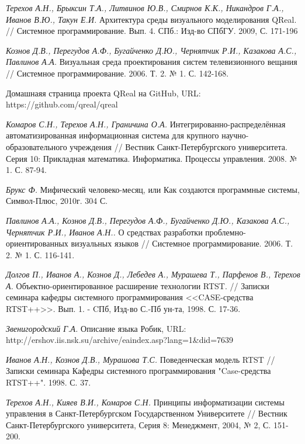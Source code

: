 \documentclass[a4paper]{article}
\begin{document}
\begin{thebibliography}{9001}

   \emph{Терехов А.Н., Брыксин Т.А., Литвинов Ю.В., Смирнов К.К., Никандров Г.А., Иванов В.Ю., Такун Е.И.} Архитектура среды визуального моделирования QReal. // Системное программирование. Вып. 4. СПб.: Изд-во СПбГУ. 2009, С. 171-196

   \emph{Кознов Д.В., Перегудов А.Ф., Бугайченко Д.Ю., Чернятчик Р.И., Казакова А.С., Павлинов А.А.} Визуальная среда проектирования систем телевизионного вещания // Системное программирование. 2006. Т. 2. № 1. С. 142-168.

   Домашнаяя страница проекта QReal на GitHub, URL: https://github.com/qreal/qreal 

   \emph{Комаров С.Н., Терехов А.Н., Граничина О.А.} Интегрированно-распределённая автоматизированная информационная система для крупного научно-образовательного учреждения // Вестник Санкт-Петербургского университета. Серия 10: Прикладная математика. Информатика. Процессы управления. 2008. № 1. С. 87-94. 

   \emph{Брукс Ф.} Мифический человеко-месяц, или Как создаются программные системы, Символ-Плюс, 2010г. 304 С.

   \emph{Павлинов А.А., Кознов Д.В., Перегудов А.Ф., Бугайченко Д.Ю., Казакова А.С., Чернятчик Р.И., Иванов А.Н..} О средствах разработки проблемно-ориентированных визуальных языков // Системное программирование. 2006. Т. 2. № 1. С. 116-141.

   \emph{Долгов П., Иванов А., Кознов Д., Лебедев А., Мурашева Т., Парфенов В., Терехов А.} Объектно-ориентированное расширение технологии RTST. // Записки семинара кафедры системного программирования <<CASE-средства RTST++>>. Вып. 1. - CПб, Изд-во С.-Пб ун-та, 1998. С. 17-36.

   \emph{Звенигородский Г.А.} Описание языка Робик, URL: http://ershov.iis.nsk.su/archive/eaindex.asp?lang=1\&did=7639 

   \emph{Иванов А.Н., Кознов Д.В., Мурашова Т.С.} Поведенческая модель RTST // Записки семинара Кафедры системного программирования "Case-средства RTST++". 1998. С. 37.

   \emph{Терехов А.Н., Кияев В.И., Комаров С.Н.} Принципы информатизации системы управления в Санкт-Петербургском Государственном Университете // Вестник Санкт-Петербургского университета, Серия 8: Менеджмент, 2004, № 2, С. 151-200.


\end{thebibliography}
\end{document}
